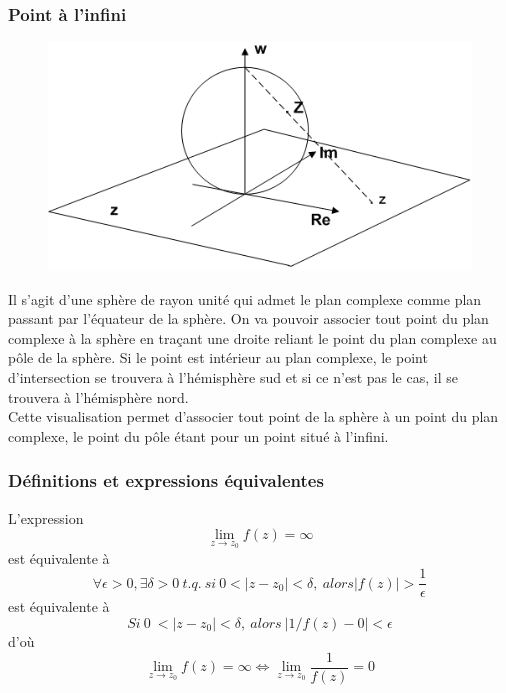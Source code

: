 \subsubsection{Point à l'infini}
\begin{figure}
	\includegraphics[scale=0.2]{ch1/image1.png}
\end{figure}
Il s'agit d'une sphère de rayon unité qui admet le plan complexe comme plan passant par
l'équateur de la sphère. On va pouvoir associer tout point du plan complexe à la sphère 
en traçant une droite reliant le point du plan complexe au pôle de la sphère. Si le point
est intérieur au plan complexe, le point d'intersection se trouvera à l'hémisphère sud et si ce n'est
pas le cas, il se trouvera à l'hémisphère nord.\\
        
Cette visualisation permet d'associer tout point de la sphère à un point du plan complexe, le
point du pôle étant pour un point situé à l'infini.
        
        
\subsubsection{Définitions et expressions équivalentes}
L'expression 
\begin{equation}
	\lim\limits_{z\rightarrow z_0} f(z) = \infty
\end{equation}
est équivalente à 
\begin{equation}
	\forall \epsilon > 0, \exists \delta > 0\ t.q.\ si\ 0 < |z-z_0| < \delta,\ alors |f(z)| > \frac{1}{\epsilon}
\end{equation}
est équivalente à
\begin{equation}
	Si\ 0\ < |z-z_0| < \delta,\ alors\ |1/f(z) - 0| < \epsilon
\end{equation}
d'où
\begin{equation}
	\lim\limits_{z\rightarrow z_0} f(z) = \infty \Leftrightarrow \lim\limits_{z\rightarrow z_0} \frac{1}{f(z)} = 0
\end{equation}
        

